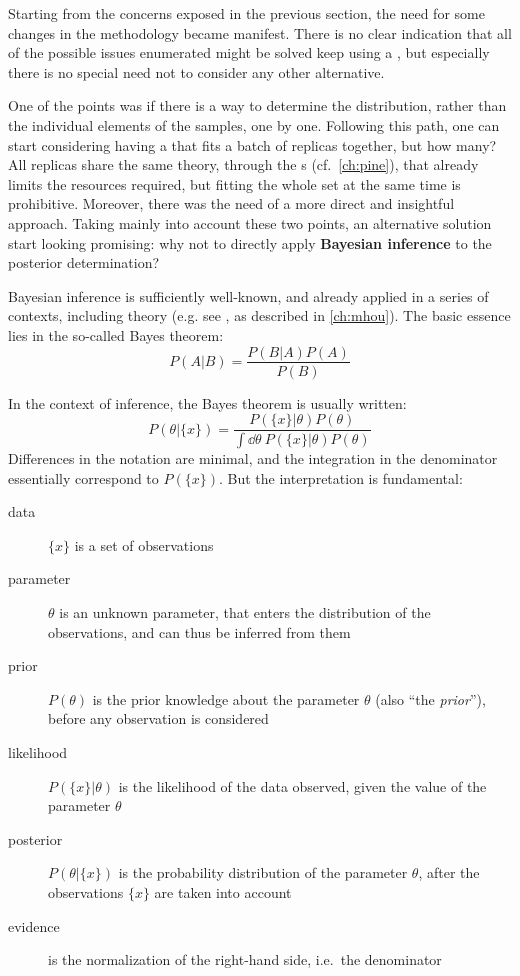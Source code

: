
Starting from the concerns exposed in the previous section, the need for some
changes in the methodology became manifest.
%
There is no clear indication that all of the possible issues enumerated might
be solved keep using a \nn, but especially there is no special need not to
consider any other alternative.

One of the points was if there is a way to determine the distribution, rather
than the individual elements of the samples, one by one.
%
Following this path, one can start considering having a \nn that fits a batch
of replicas together, but how many?
%
All replicas share the same theory, through the \fktab{}s (cf.\
\cref{ch:pine}), that already limits the resources required, but fitting the
whole set at the same time is prohibitive.
%
Moreover, there was the need of a more direct and insightful approach.
%
Taking mainly into account these two points, an alternative solution start
looking promising: why not to directly apply \textbf{Bayesian inference} to the
\pdf posterior determination?

Bayesian inference is sufficiently well-known, and already applied in a series
of contexts, including \hep theory (e.g. see \cite{Cacciari:2011ze}, as
described in \cref{ch:mhou}).
%
The basic essence lies in the so-called Bayes theorem:
\begin{equation}
  P(A|B) = \frac{P(B|A) P(A)}{P(B)}
  \label{eq:gp/bayes}
\end{equation}

In the context of inference, the Bayes theorem is usually written:
\begin{equation}
  P\left(\theta|\{x\}\right) = \frac{P\left(\{x\}|\theta\right) P\left(\theta\right)}{
    \int \dd\theta~ P\left(\{x\}|\theta\right) P\left(\theta\right)
  }
  \label{eq:gp/bayes-inf}
\end{equation}
Differences in the notation are minimal, and the integration in the denominator
essentially correspond to $P(\{x\})$.
%
But the interpretation is fundamental:
\begin{description}
  \item[data] $\{x\}$ is a set of observations
  \item[parameter] $\theta$ is an unknown parameter, that enters the
    distribution of the observations, and can thus be inferred from them
  \item[prior] $P(\theta)$ is the prior knowledge about the parameter $\theta$
    (also \enquote{the \textit{prior}}), before any observation is considered
  \item[likelihood] $P\left(\{x\}|\theta\right)$ is the likelihood of the data
    observed, given the value of the parameter $\theta$
  \item[posterior] $P\left(\theta|\{x\}\right)$ is the probability distribution
    of the parameter $\theta$, after the observations $\{x\}$ are taken into
    account
  \item[evidence] is the normalization of the right-hand side, i.e.\ the
    denominator
\end{description}


